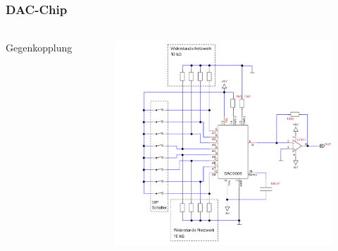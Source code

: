 \begin{frame}
    \frametitle{DAC-Chip}
    \framesubtitle{}
    \begin{columns}[c]
             \begin{block}{}
                Gegenkopplung 

             \end{block}
            \begin{figure}[H]
                \begin{center}
                        \includegraphics[scale=0.25]{./img/schaltung/dac_0.png}
                \end{center}
            \end{figure}    
    \end{columns}
\end{frame}

